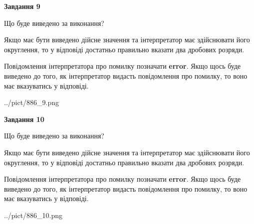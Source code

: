 \documentclass[12pt, ukrainian]{article}
\begin{document}
{\begin {Large}
{\begin {center}\textbf{Завдання 9}\end {center}}\par
Що буде виведено за виконання? \par

Якщо має бути виведено дійсне значення та інтерпретатор має здійснювати його округлення, 
то у відповіді достатньо правильно вказати два дробових розряди.

Повідомлення інтерпретатора про помилку позначати \textbf{error}.
Якщо щось буде виведено до того, як інтерпретатор видасть повідомлення про помилку, 
то воно має вказуватись у відповіді. \par

\begin{center}
	{../pict/886_9.png}
\end{center}
\newpage

{\begin {center}\textbf{Завдання 10}\end {center}}\par
Що буде виведено за виконання? \par

Якщо має бути виведено дійсне значення та інтерпретатор має здійснювати його округлення, 
то у відповіді достатньо правильно вказати два дробових розряди.

Повідомлення інтерпретатора про помилку позначати \textbf{error}.
Якщо щось буде виведено до того, як інтерпретатор видасть повідомлення про помилку, 
то воно має вказуватись у відповіді. \par

\begin{center}
	{../pict/886_10.png}
\end{center}
\newpage

\end {Large}}
\end{document}
